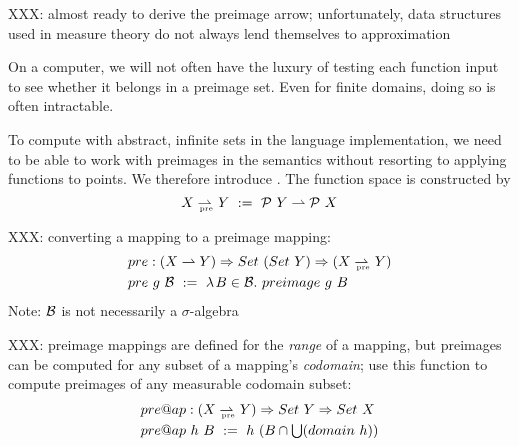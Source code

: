 \documentclass[preprint]{sigplanconf}
\newcommand{\pto}{\rightharpoonup}
\newcommand{\pre}{_\mathrm{pre}}
\newcommand{\prepto}{\pto_{\mspace{-19mu}\pre}}
\begin{document}
XXX: almost ready to derive the preimage arrow; unfortunately, data structures used in measure theory do not always lend themselves to approximation

On a computer, we will not often have the luxury of testing each function input to see whether it belongs in a preimage set.
Even for finite domains, doing so is often intractable.

To compute with abstract, infinite sets in the language implementation, we need to be able to work with preimages in the semantics without resorting to applying functions to points.
We therefore introduce . The function space is constructed by
\begin{equation}
	X \prepto Y \ := \ \powerset~Y \pto \powerset~X
\end{equation}

XXX: converting a mapping to a preimage mapping:
\begin{equation}
\begin{aligned}
	&pre : (X \pto Y) \tto Set~(Set~Y) \tto (X \prepto Y) \\
	&pre~g~\B \ := \ \fun{B \in \B}{preimage~g~B}
\end{aligned}
\end{equation}
Note: $\mathcal{B}$ is not necessarily a $\sigma$-algebra

XXX: preimage mappings are defined for the \emph{range} of a mapping, but preimages can be computed for any subset of a mapping's \emph{codomain}; use this function to compute preimages of any measurable codomain subset:
\begin{equation}
\begin{aligned}
	&pre@ap : (X \prepto Y) \tto Set~Y \tto Set~X \\
	&pre@ap~h~B \ := \ h~(B \i \U(domain~h))
\end{aligned}
\end{equation}
\end{document}
